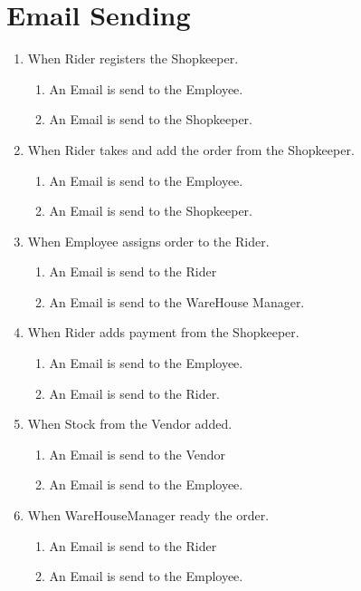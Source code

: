 \documentclass[12pt,a4paper]{report}
\begin{document}
\chapter {Email Sending}
\begin{enumerate}
\item When Rider registers the Shopkeeper.
 \begin{enumerate}
    \item An Email is send to the Employee.
    \item An Email is send to the Shopkeeper.
 \end{enumerate}

\item When Rider takes and add the order from the Shopkeeper.
 \begin{enumerate}
    \item An Email is send to the Employee.
    \item An Email is send to the Shopkeeper.
 \end{enumerate}

\item When Employee assigns order to the Rider.
 \begin{enumerate}
    \item An Email is send to the Rider
    \item An Email is send to the WareHouse Manager.
 \end{enumerate}

 \item When Rider adds payment from the Shopkeeper.
 \begin{enumerate}
    \item An Email is send to the Employee.
    \item An Email is send to the Rider.
 \end{enumerate}
 
 \item When Stock from the Vendor added.
 \begin{enumerate}
    \item An Email is send to the Vendor
    \item An Email is send to the Employee.
 \end{enumerate}

 \item When WareHouseManager ready the order.
 \begin{enumerate}
    \item An Email is send to the Rider
    \item An Email is send to the Employee.
 \end{enumerate}


\end{enumerate}
\newpage
\end{document}
